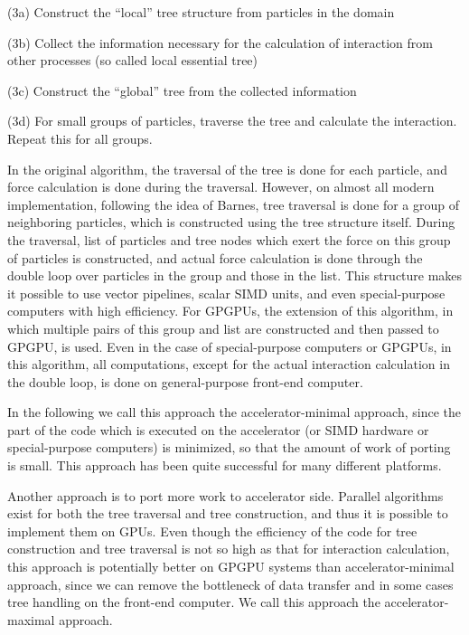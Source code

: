 \documentclass[sigconf]{acmart}
\begin{document}
\begin{description}

\item{(3a)} Construct the ``local'' tree structure from particles in
  the domain
\item{(3b)} Collect the information necessary for the calculation of
  interaction from other processes (so called local essential tree)
\item{(3c)} Construct the ``global'' tree from the collected information
\item{(3d)} For small groups of particles, traverse the tree and
  calculate the interaction. Repeat this for all groups.
\end{description}
In the original algorithm\cite{BarnesHut1986}, the traversal of the
tree is done for each particle, and force calculation is done during
the traversal. However, on almost all modern implementation, following
the idea of Barnes\cite{Barnes1990}, tree traversal is done for a
group of neighboring particles, which is constructed using the tree
structure itself. During the traversal, list of particles and tree
nodes which exert the force on this group of particles is constructed,
and actual force calculation is done through the double loop over
particles in the group and those in the list. This structure makes it
possible to use vector pipelines, scalar SIMD units, and even
special-purpose computers\cite{Makino1991c} with high efficiency. For
GPGPUs, the extension of this algorithm, in which multiple pairs of
this group and list are constructed and then passed to GPGPU, is
used\cite{Hamadaetal2009}. Even in the case of special-purpose
computers or GPGPUs, in this algorithm, all computations, except for
the actual interaction calculation in the double loop, is done on
general-purpose front-end computer.

In the following we call this
approach the accelerator-minimal approach, since the part of the code
which is executed on the accelerator (or SIMD hardware or
special-purpose computers) is minimized, so that the amount of work of
porting is small.  This approach has been quite successful for many
different platforms. 

Another approach is to port more work to accelerator side. Parallel
algorithms exist for both the tree traversal and tree construction,
and thus it is possible to implement them on GPUs\cite{Bedorfetal2012}. 
Even though the efficiency of the code for tree construction and tree
traversal is not so high as that for interaction calculation, this
approach is potentially better on GPGPU systems than
accelerator-minimal approach, since we can remove the bottleneck of
data transfer and in some cases tree handling on the front-end
computer. We call this approach the accelerator-maximal approach.
\end{document}
